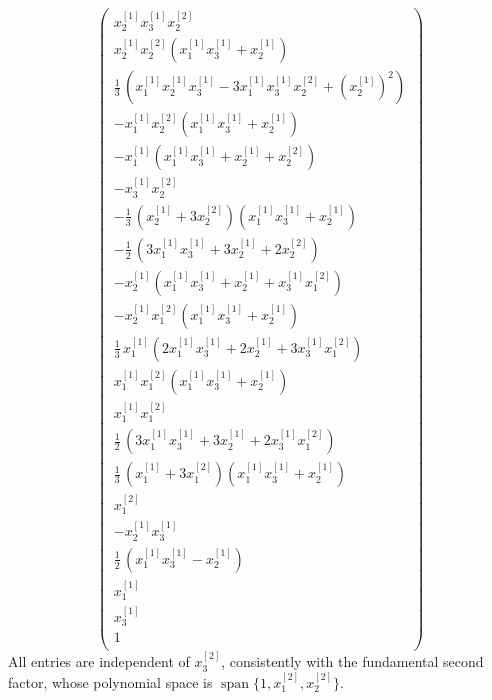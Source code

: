 \documentclass[12pt,reqno]{amsart}
\numberwithin{equation}{section}
\begin{document}
	\begin{equation}
	\left(
	\begin{array}{c}
	x_2^{[1]} x_3^{[1]} x_2^{[2]} \\
	x_2^{[1]} x_2^{[2]} \left(x_1^{[1]} x_3^{[1]} + x_2^{[1]}\right) \\
	\frac{1}{3}\,\left(x_1^{[1]} x_2^{[1]} x_3^{[1]} - 3 x_1^{[1]} x_3^{[1]} x_2^{[2]} + \left(x_2^{[1]}\right)^{2}\right) \\
	- x_1^{[1]} x_2^{[2]} \left(x_1^{[1]} x_3^{[1]} + x_2^{[1]}\right) \\
	- x_1^{[1]} \left(x_1^{[1]} x_3^{[1]} + x_2^{[1]} + x_2^{[2]}\right) \\
	- x_3^{[1]} x_2^{[2]} \\
	-\frac{1}{3}\,\left(x_2^{[1]} + 3 x_2^{[2]}\right) \left(x_1^{[1]} x_3^{[1]} + x_2^{[1]}\right) \\
	-\frac{1}{2}\,\left(3 x_1^{[1]} x_3^{[1]} + 3 x_2^{[1]} + 2 x_2^{[2]}\right) \\
	- x_2^{[1]} \left(x_1^{[1]} x_3^{[1]} + x_2^{[1]} + x_3^{[1]} x_1^{[2]}\right) \\
	- x_2^{[1]} x_1^{[2]} \left(x_1^{[1]} x_3^{[1]} + x_2^{[1]}\right) \\
	\frac{1}{3}\,x_1^{[1]} \left(2 x_1^{[1]} x_3^{[1]} + 2 x_2^{[1]} + 3 x_3^{[1]} x_1^{[2]}\right) \\
	x_1^{[1]} x_1^{[2]} \left(x_1^{[1]} x_3^{[1]} + x_2^{[1]}\right) \\
	x_1^{[1]} x_1^{[2]} \\
	\frac{1}{2}\,\left(3 x_1^{[1]} x_3^{[1]} + 3 x_2^{[1]} + 2 x_3^{[1]} x_1^{[2]}\right) \\
	\frac{1}{3}\,\left(x_1^{[1]} + 3 x_1^{[2]}\right) \left(x_1^{[1]} x_3^{[1]} + x_2^{[1]}\right) \\
	x_1^{[2]} \\
	- x_2^{[1]} x_3^{[1]} \\
	\frac{1}{2}\,\left(x_1^{[1]} x_3^{[1]} - x_2^{[1]}\right) \\
	x_1^{[1]} \\
	x_3^{[1]} \\
	1 \\
	\end{array}
	\right)
	\label{eqn:21_oscillator_basis_appendix}
	\end{equation}
	\endgroup
	All entries are independent of $x_3^{[2]}$, consistently with the
	fundamental second factor, whose polynomial space is
	$\operatorname{span}\{1,x_1^{[2]},x_2^{[2]}\}$.

	\clearpage
\end{document}
